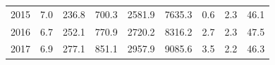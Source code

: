 \documentclass[openany]{book}
\begin{document}
\begin{table}[htbp]
{\begin{tabular}{ccccccccc}
\rowcolor[HTML]{F8F9FA} 
{\color[HTML]{202122} 2015}        & {\color[HTML]{202122} 7.0}                                                                  & {\color[HTML]{202122} 236.8}                                                                        & {\color[HTML]{202122} 700.3}                                                                    & {\color[HTML]{202122} 2581.9}                                                                              & {\color[HTML]{202122} 7635.3}                                                                          & {\color[HTML]{202122} 0.6}                                                                            & {\color[HTML]{202122} 2.3}                                                                               & {\color[HTML]{202122} 46.1}                                                                              \\
\rowcolor[HTML]{F8F9FA} 
{\color[HTML]{202122} 2016}        & {\color[HTML]{202122} 6.7}                                                                  & {\color[HTML]{202122} 252.1}                                                                        & {\color[HTML]{202122} 770.9}                                                                    & {\color[HTML]{202122} 2720.2}                                                                              & {\color[HTML]{202122} 8316.2}                                                                          & {\color[HTML]{202122} 2.7}                                                                            & {\color[HTML]{202122} 2.3}                                                                               & {\color[HTML]{202122} 47.5}                                                                              \\
\rowcolor[HTML]{F8F9FA} 
{\color[HTML]{202122} 2017}        & {\color[HTML]{202122} 6.9}                                                                  & {\color[HTML]{202122} 277.1}                                                                        & {\color[HTML]{202122} 851.1}                                                                    & {\color[HTML]{202122} 2957.9}                                                                              & {\color[HTML]{202122} 9085.6}                                                                          & {\color[HTML]{202122} 3.5}                                                                            & {\color[HTML]{202122} 2.2}                                                                               & {\color[HTML]{202122} 46.3}                                                                              \\

\end{tabular}}
\end{table}
\end{document}
